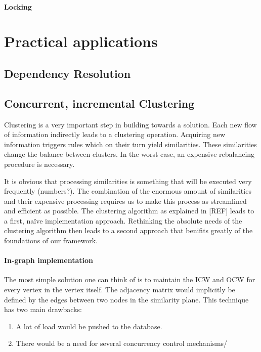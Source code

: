 \paragraph{Locking}

\section{Practical applications}

\subsection{Dependency Resolution}

\subsection{Concurrent, incremental Clustering}

Clustering is a very important step in building towards a solution. Each new flow of information indirectly leads to a clustering operation. Acquiring new information triggers rules which on their turn yield similarities. These similarities change the balance between clusters. In the worst case, an expensive rebalancing procedure is necessary.

It is obvious that processing similarities is something that will be executed very frequently (numbers?). The combination of the enormous amount of similarities and their expensive processing requires us to make this process as streamlined and efficient as possible. The clustering algorithm as explained in [REF] leads to a first, na\"ive implementation approach. Rethinking the absolute needs of the clustering algorithm then leads to a second approach that benifits greatly of the foundations of our framework.

\paragraph{In-graph implementation} The most simple solution one can think of is to maintain the ICW and OCW for every vertex in the vertex itself. The adjacency matrix would implicitly be defined by the edges between two nodes in the similarity plane. This technique has two main drawbacks:

\begin{enumerate}
\item A lot of load would be pushed to the database.
\item There would be a need for several concurrency control mechanisms/
\end{enumerate}


